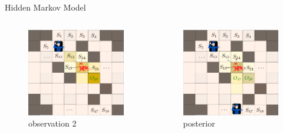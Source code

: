 \documentclass{beamer}
\theoremstyle{remark}
\begin{document}
\begin{frame}{Hidden Markov Model}
\begin{columns}
\begin{column}{.33\textwidth}
\begin{figure}
			\includegraphics[width=0.9\linewidth]{observation2.png}
			\vspace{-10pt}
			\caption*{\tiny observation 2}
		\end{figure}
	\end{column}
	
	\begin{column}{.34\textwidth}
		\begin{figure}
			\includegraphics[width=0.9\linewidth]{posterior.png}
			\vspace{-10pt}
			\caption*{\tiny posterior}
		\end{figure}
	\end{column}
\end{columns}	
\end{frame}
\end{document}
